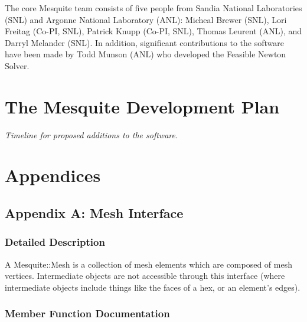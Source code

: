 \documentclass[letter]{report}
\begin{document}
The core Mesquite team consists of five people from Sandia
National Laboratories (SNL) and Argonne National Laboratory (ANL):
Micheal Brewer (SNL), Lori Freitag (Co-PI, SNL), Patrick Knupp (Co-PI, SNL), 
Thomas Leurent (ANL), and Darryl Melander (SNL).  In addition,
significant contributions to the software have been made by
Todd Munson (ANL) who developed the Feasible Newton Solver.

\chapter{The Mesquite Development Plan}

{\it Timeline for proposed additions to the software.}



\chapter{Appendices}

\section{Appendix A: Mesh Interface}
\label{append_mesh}

\newcommand{\entrylabel}[1]{
   {\parbox[b]{\labelwidth-4pt}{\makebox[0pt][l]{\textbf{#1}}\\}}}
\newenvironment{Desc}
{\begin{list}{}
  {
    \settowidth{\labelwidth}{40pt}
    \setlength{\leftmargin}{\labelwidth}
    \setlength{\parsep}{0pt}
    \setlength{\itemsep}{-4pt}
    \renewcommand{\makelabel}{\entrylabel}
  }
}
{\end{list}}

\subsection{Detailed Description}
A Mesquite::Mesh is a collection of mesh elements which are composed of mesh vertices. Intermediate objects are not accessible through this interface (where intermediate objects include things like the faces of a hex, or an element's edges).

\subsection{Member Function Documentation}
\end{document}
